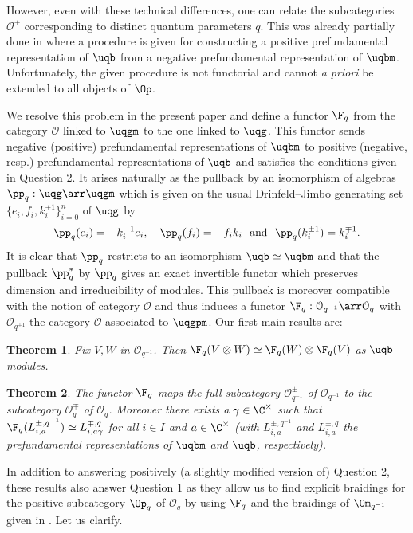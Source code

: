 \documentclass[11pt]{amsart}
\newtheorem{theorem}{Theorem}[section]
\theoremstyle{definition}
\theoremstyle{remark}
\numberwithin{equation}{section}
\begin{document}
However, even with these technical differences, one can relate the subcategories $\mathcal{O}^{\pm}$ corresponding to distinct quantum parameters $q$. This was already partially done in \cite{hj} where a procedure is given for constructing a positive prefundamental representation of $\uqb$ from a negative prefundamental representation of $\uqbm$. Unfortunately, the given procedure is not functorial and cannot \textit{a priori} be extended to all objects of $\Op$.  \par
We resolve this problem in the present paper and define a functor $\F_q$ from the category $\mathcal{O}$ linked to $\uqgm$ to the one linked to $\uqg$. This functor sends negative (positive) prefundamental representations of $\uqbm$ to positive (negative, resp.) prefundamental representations of $\uqb$ and satisfies the conditions given in Question 2. It arises naturally as the pullback by an isomorphism of algebras $\pp_q:\uqg\arr\uqgm$ which is given on the usual Drinfeld--Jimbo generating set $\{e_i,f_i,k_i^{\pm 1}\}_{i=0}^n$ of $\uqg$ by 
$$\pp_q(e_i)=-k_i^{-1}e_i,\quad \pp_q(f_i) = -f_ik_i \ \ \text{and} \ \  \pp_q(k_i^{\pm 1}) = k_i^{\mp 1}.$$ 
It is clear that $\pp_q$ restricts to an isomorphism $\uqb\simeq \uqbm$ and that the pullback $\pp_q^*$ by $\pp_q$ gives an exact invertible functor which preserves dimension and irreducibility of modules. This pullback is moreover compatible with the notion of category $\mathcal{O}$ and thus induces a functor $\F_q : \mathcal{O}_{q^{-1}} \arr \mathcal{O}_q$ with $\mathcal{O}_{q^{\pm 1}}$ the category $\mathcal{O}$ associated to $\uqgpm$. Our first main results are:
\begin{theorem}\label{thm:ComonIntro} Fix $V,W$ in $\mathcal{O}_{q^{-1}}$. Then $\F_q(V\otimes W)\simeq \F_q(W)\otimes \F_q(V)$ as $\uqb$-modules.
\end{theorem}
\begin{theorem}\label{thm:PosNeg} The functor $\F_q$ maps the full subcategory $\mathcal{O}^{\pm}_{q^{-1}}$ of $\mathcal{O}_{q^{-1}}$ to the subcategory $\mathcal{O}^{\mp}_{q}$ of $\mathcal{O}_q$. Moreover there exists a $\gamma\in \C^{\times}$ such that $ \F_q(L_{i,a}^{\pm, q^{-1}})\simeq L_{i,a\gamma}^{\mp,q} $ for all $i\in I$ and $a\in \C^{\times}$ (with $L_{i,a}^{\pm, q^{-1}}$ and $L_{i,a}^{\pm, q}$ the prefundamental representations of $\uqbm$ and $\uqb$, respectively). 
\end{theorem} 
In addition to answering positively (a slightly modified version of) Question 2, these results also answer Question 1 as they allow us to find explicit braidings for the positive subcategory $\Op_q$ of $\mathcal{O}_q$ by using $\F_q$ and the braidings of $\Om_{q^{-1}}$ given in \cite{her}. Let us clarify. \par 
\end{document}
